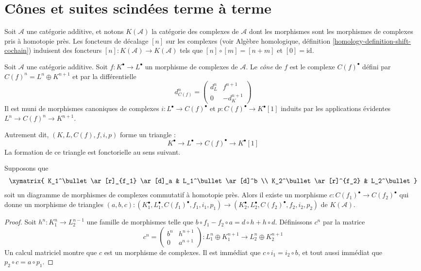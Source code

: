 \section{Cônes et suites scindées terme à terme}
\label{section-cones}

\noindent
Soit $\mathcal{A}$ une catégorie additive, et notons $K(\mathcal{A})$ la
catégorie des complexes de $\mathcal{A}$ dont les morphismes sont les
morphismes de complexes pris à homotopie près. Les foncteurs de décalage $[n]$
sur les complexes (voir Algèbre homologique, définition
\ref{homology-definition-shift-cochain}) induisent des foncteurs
$[n] : K(\mathcal{A}) \to K(\mathcal{A})$ tels que
$[n] \circ [m] = [n + m]$ et $[0] = \text{id}$.

\begin{definition}
\label{definition-cone}
Soit $\mathcal{A}$ une catégorie additive.
Soit $f : K^\bullet \to L^\bullet$ un morphisme de complexes de
$\mathcal{A}$. Le {\it cône} de $f$ est le complexe $C(f)^\bullet$ défini par
$C(f)^n = L^n \oplus K^{n + 1}$ et par la différentielle
$$
d_{C(f)}^n =
\left(
\begin{matrix}
d^n_L & f^{n + 1} \\
0 & -d_K^{n + 1}
\end{matrix}
\right)
$$
Il est muni de morphismes canoniques de complexes
$i : L^\bullet \to C(f)^\bullet$ et $p : C(f)^\bullet \to K^\bullet[1]$
induits par les applications évidentes $L^n \to C(f)^n \to K^{n + 1}$.
\end{definition}

\noindent
Autrement dit, $(K, L, C(f), f, i, p)$ forme un triangle :
$$
K^\bullet \to L^\bullet \to C(f)^\bullet \to K^\bullet[1]
$$
La formation de ce triangle est fonctorielle au sens suivant.

\begin{lemma}
\label{lemma-functorial-cone}
Supposons que
$$
\xymatrix{
K_1^\bullet \ar[r]_{f_1} \ar[d]_a & L_1^\bullet \ar[d]^b \\
K_2^\bullet \ar[r]^{f_2} & L_2^\bullet
}
$$
soit un diagramme de morphismes de complexes commutatif à homotopie près.
Alors il existe un morphisme $c : C(f_1)^\bullet \to C(f_2)^\bullet$ qui donne
un morphisme de triangles
$(a, b, c) : (K_1^\bullet, L_1^\bullet, C(f_1)^\bullet, f_1, i_1, p_1)
\to
(K_2^\bullet, L_2^\bullet, C(f_2)^\bullet, f_2, i_2, p_2)$
de $K(\mathcal{A})$.
\end{lemma}

\begin{proof}
Soit $h^n : K_1^n \to L_2^{n - 1}$ une famille de morphismes telle que
$b \circ f_1 - f_2 \circ a= d \circ h + h \circ d$.
Définissons $c^n$ par la matrice
$$
c^n =
\left(
\begin{matrix}
b^n & h^{n + 1} \\
0 & a^{n + 1}
\end{matrix}
\right) :
L_1^n \oplus K_1^{n + 1} \to L_2^n \oplus K_2^{n + 1}
$$
Un calcul matriciel montre que $c$ est un morphisme de complexes.
Il est immédiat que $c \circ i_1 = i_2 \circ b$, et tout aussi immédiat que
$p_2 \circ c = a \circ p_1$.
\end{proof}

